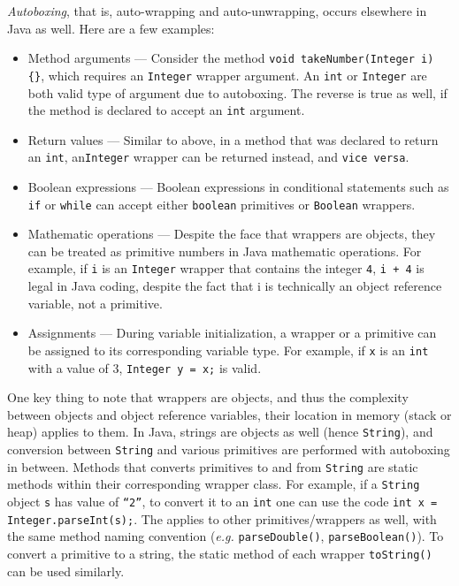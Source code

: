 \documentclass{tufte-handout}
\begin{document}
    \emph{Autoboxing}, that is, auto-wrapping and auto-unwrapping, occurs elsewhere in Java as well. Here are a few examples:
    
    \begin{itemize}
        \item Method arguments --- Consider the method \texttt{void takeNumber(Integer i) \{\}}, which requires an \texttt{Integer} wrapper argument. An \texttt{int} or \texttt{Integer} are both valid type of argument due to autoboxing. The reverse is true as well, if the method is declared to accept an \texttt{int} argument.
        \item Return values --- Similar to above, in a method that was declared to return an \texttt{int}, an\texttt{Integer} wrapper can be returned instead, and \texttt{vice versa}.
        \item Boolean expressions --- Boolean expressions in conditional statements such as \texttt{if} or \texttt{while} can accept either \texttt{boolean} primitives or \texttt{Boolean} wrappers.
        \item Mathematic operations --- Despite the face that wrappers are objects, they can be treated as primitive numbers in Java mathematic operations. For example, if \texttt{i} is an \texttt{Integer} wrapper that contains the integer \texttt{4}, \texttt{i + 4} is legal in Java coding, despite the fact that i is technically an object reference variable, not a primitive. 
        \item Assignments --- During variable initialization, a wrapper or a primitive can be assigned to its corresponding variable type. For example, if \texttt{x} is an \texttt{int} with a value of 3, \texttt{Integer y = x;} is valid.
    \end{itemize}    

    One key thing to note that wrappers are objects, and thus the complexity between objects and object reference variables, their location in memory (stack or heap) applies to them. In Java, strings are objects as well (hence \texttt{String}), and conversion between \texttt{String} and various primitives are performed with autoboxing in between. Methods that converts primitives to and from \texttt{String} are static methods within their corresponding wrapper class. For example, if a \texttt{String} object \texttt{s} has value of \texttt{``2''}, to convert it to an \texttt{int} one can use the code \texttt{int x = Integer.parseInt(s);}. The applies to other primitives/wrappers as well, with the same method naming convention (\textit{e.g.} \texttt{parseDouble()}, \texttt{parseBoolean()}). To convert a primitive to a string, the static method of each wrapper \texttt{toString()} can be used similarly.
\end{document}
